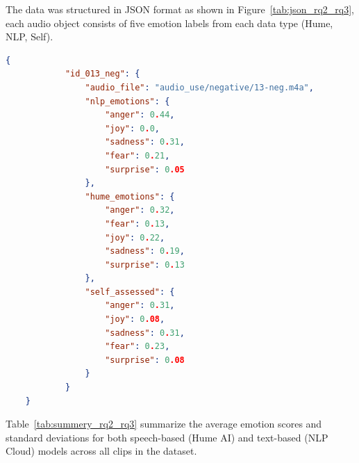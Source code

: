 The data was structured in JSON format as shown in Figure~\ref{tab:json_rq2_rq3}, each audio object consists of five emotion labels from each data type (Hume, NLP, Self). 

\begin{center}
    \begin{minipage}{0.7\textwidth} 
    \begin{lstlisting}[language=json, caption={Example of stored JSON structure for Hume, NLP, Self-labeling.}]
        {
            "id_013_neg": {
                "audio_file": "audio_use/negative/13-neg.m4a",
                "nlp_emotions": {
                    "anger": 0.44,
                    "joy": 0.0,
                    "sadness": 0.31,
                    "fear": 0.21,
                    "surprise": 0.05
                },
                "hume_emotions": {
                    "anger": 0.32,
                    "fear": 0.13,
                    "joy": 0.22,
                    "sadness": 0.19,
                    "surprise": 0.13
                },
                "self_assessed": {
                    "anger": 0.31,
                    "joy": 0.08,
                    "sadness": 0.31,
                    "fear": 0.23,
                    "surprise": 0.08
                }
            }
    }
    \end{lstlisting}
    \label{tab:json_rq2_rq3}
\end{minipage}
\end{center} 

Table~\ref{tab:summery_rq2_rq3} summarize the average emotion scores and standard deviations for both speech-based (Hume AI) and text-based (NLP Cloud) 
models across all clips in the dataset. 

